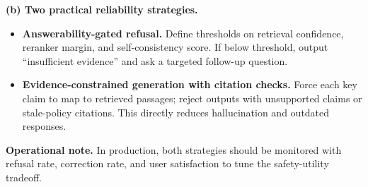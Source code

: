 \documentclass[12pt]{article}
\begin{document}
\textbf{(b) Two practical reliability strategies.}
\begin{itemize}[leftmargin=1.2em]
    \item \textbf{Answerability-gated refusal.}
    Define thresholds on retrieval confidence, reranker margin, and self-consistency score. If below threshold, output ``insufficient evidence'' and ask a targeted follow-up question.

    \item \textbf{Evidence-constrained generation with citation checks.}
    Force each key claim to map to retrieved passages; reject outputs with unsupported claims or stale-policy citations. This directly reduces hallucination and outdated responses.
\end{itemize}

\textbf{Operational note.}
In production, both strategies should be monitored with refusal rate, correction rate, and user satisfaction to tune the safety-utility tradeoff.



\end{document}
